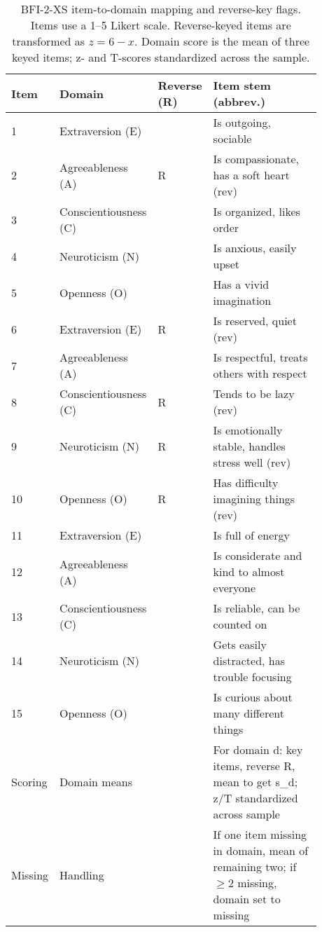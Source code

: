\begin{table}[t]
\centering
\caption{BFI-2-XS item-to-domain mapping and reverse-key flags. Items use a 1--5 Likert scale. Reverse-keyed items are transformed as \(z = 6 - x\). Domain score is the mean of three keyed items; z- and T-scores standardized across the sample.}
\label{tab:bfi2xs-scoring}
\begin{tabular}{p{0.08\linewidth}p{0.20\linewidth}p{0.12\linewidth}p{0.48\linewidth}}
\toprule
Item & Domain & Reverse (R) & Item stem (abbrev.) \\
\midrule
1 & Extraversion (E) &  & Is outgoing, sociable \\
2 & Agreeableness (A) & R & Is compassionate, has a soft heart (rev) \\
3 & Conscientiousness (C) &  & Is organized, likes order \\
4 & Neuroticism (N) &  & Is anxious, easily upset \\
5 & Openness (O) &  & Has a vivid imagination \\
6 & Extraversion (E) & R & Is reserved, quiet (rev) \\
7 & Agreeableness (A) &  & Is respectful, treats others with respect \\
8 & Conscientiousness (C) & R & Tends to be lazy (rev) \\
9 & Neuroticism (N) & R & Is emotionally stable, handles stress well (rev) \\
10 & Openness (O) & R & Has difficulty imagining things (rev) \\
11 & Extraversion (E) &  & Is full of energy \\
12 & Agreeableness (A) &  & Is considerate and kind to almost everyone \\
13 & Conscientiousness (C) &  & Is reliable, can be counted on \\
14 & Neuroticism (N) &  & Gets easily distracted, has trouble focusing \\
15 & Openness (O) &  & Is curious about many different things \\
\midrule
Scoring & Domain means &  & For domain d: key items, reverse R, mean to get s_d; z/T standardized across sample \\
Missing & Handling &  & If one item missing in domain, mean of remaining two; if \(\geq 2\) missing, domain set to missing \\
\bottomrule
\end{tabular}
\end{table}

